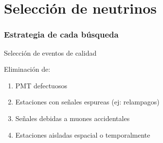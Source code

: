 \section[Selecci\'on $\nu$]{Selecci\'on de neutrinos}

\begin{frame}
 \frametitle{Estrategia de cada b\'usqueda}
 \begin{center}
 \end{center}
\end{frame}

\begin{frame}{Selecci\'on de eventos de calidad}
\begin{block}{Eliminaci\'on de:}
 \begin{enumerate}\setlength\itemsep{3mm}
  \item PMT defectuosos
  \item Estaciones con se\~nales espureas (ej: relampagos)
  \item Se\~nales debidas a muones accidentales
  \item Estaciones aisladas espacial o temporalmente
 \end{enumerate}
\end{block}
\end{frame}


